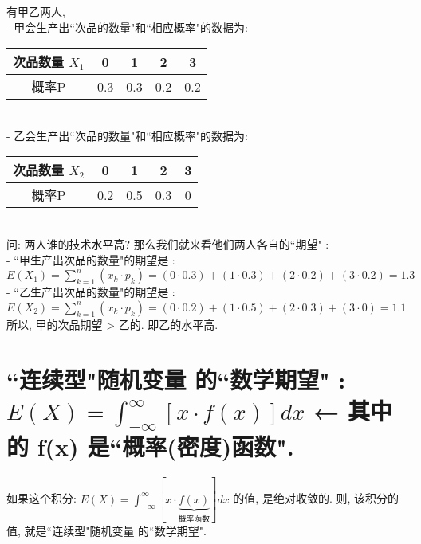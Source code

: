 \documentclass[UTF8]{ctexart}
\begin{document}
	\begin{myEnvSample}
		有甲乙两人, \\
		- 甲会生产出``次品的数量"和``相应概率"的数据为:\\
		\begin{tabular}{|c|c|c|c|c|}
			\hline
			次品数量 $X_1$ & 0 & 1 & 2 & 3 \\
			\hline
			概率P & 0.3 & 0.3 & 0.2 & 0.2 \\
			\hline
		\end{tabular} \\
	
		- 乙会生产出``次品的数量"和``相应概率"的数据为: \\
				\begin{tabular}{|c|c|c|c|c|}
			\hline
			次品数量 $X_2$ & 0 & 1 & 2 & 3 \\
			\hline
			概率P & 0.2 & 0.5 & 0.3 & 0 \\
			\hline
		\end{tabular} \\
		
		问: 两人谁的技术水平高? 那么我们就来看他们两人各自的``期望" : \\
		- ``甲生产出次品的数量"的期望是 : \\
		$
		E\left( X_1 \right) =\sum_{k=1}^n{(x_k\cdot p_k)}=\left( 0\cdot 0.3 \right) +\left( 1\cdot 0.3 \right) +\left( 2\cdot 0.2 \right) +\left( 3\cdot 0.2 \right) =1.3
		$ \\
		
		- ``乙生产出次品的数量"的期望是 : \\
		$
		E\left( X_2 \right) =\sum_{k=1}^n{(x_k\cdot p_k)}=\left( 0\cdot 0.2 \right) +\left( 1\cdot 0.5 \right) +\left( 2\cdot 0.3 \right) +\left( 3\cdot 0 \right) =1.1
		$ \\
		
		所以, 甲的次品期望 > 乙的. 即乙的水平高. 	
	\end{myEnvSample}

	






\section{``连续型"随机变量 的``数学期望" : $E(X)=\int_{-\infty}^{\infty}{\left[ x\cdot f\left( x \right) \right] dx}	$  ← 其中的 f(x) 是``概率(密度)函数".}

如果这个积分: $ \boxed{	E(X)=\int_{-\infty}^{\infty}{\left[ x\cdot \underset{\text{概率函数}}{\underbrace{f\left( x \right) }} \right] dx}}$ 的值, 是绝对收敛的. 则, 该积分的值, 就是``连续型"随机变量 的``数学期望". \\
\end{document}
